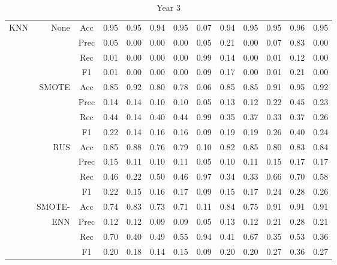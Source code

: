 \begin{table*}
\begin{narrow}{-1cm}{-1cm}
\begin{subtable}[t]{2.05\columnwidth}
\begin{tabular}{l|r|c|cccccccccc}
        KNN & None & Acc & 0.95 & 0.95 & 0.94 & 0.95 & 0.07 & 0.94 & 0.95 & 0.95 & 0.96 & 0.95 \\
        ~ & ~ & Prec & 0.05 & 0.00 & 0.00 & 0.00 & 0.05 & 0.21 & 0.00 & 0.07 & 0.83 & 0.00 \\
        ~ & ~ & Rec & 0.01 & 0.00 & 0.00 & 0.00 & 0.99 & 0.14 & 0.00 & 0.01 & 0.12 & 0.00 \\
        ~ & ~ & F1 & 0.01 & 0.00 & 0.00 & 0.00 & 0.09 & 0.17 & 0.00 & 0.01 & 0.21 & 0.00 \\
        \cline{2-13}
        ~ & SMOTE & Acc & 0.85 & 0.92 & 0.80 & 0.78 & 0.06 & 0.85 & 0.85 & 0.91 & 0.95 & 0.92 \\
        ~ & ~ & Prec & 0.14 & 0.14 & 0.10 & 0.10 & 0.05 & 0.13 & 0.12 & 0.22 & 0.45 & 0.23 \\
        ~ & ~ & Rec & 0.44 & 0.14 & 0.40 & 0.44 & 0.99 & 0.35 & 0.37 & 0.33 & 0.37 & 0.26 \\
        ~ & ~ & F1 & 0.22 & 0.14 & 0.16 & 0.16 & 0.09 & 0.19 & 0.19 & 0.26 & 0.40 & 0.24 \\
        \cline{2-13}
        ~ & RUS & Acc & 0.85 & 0.88 & 0.76 & 0.79 & 0.10 & 0.82 & 0.85 & 0.80 & 0.83 & 0.84 \\
        ~ & ~ & Prec & 0.15 & 0.11 & 0.10 & 0.11 & 0.05 & 0.10 & 0.11 & 0.15 & 0.17 & 0.17 \\
        ~ & ~ & Rec & 0.46 & 0.22 & 0.50 & 0.46 & 0.97 & 0.34 & 0.33 & 0.66 & 0.70 & 0.58 \\
        ~ & ~ & F1 & 0.22 & 0.15 & 0.16 & 0.17 & 0.09 & 0.15 & 0.17 & 0.24 & 0.28 & 0.26 \\
        \cline{2-13}
        ~ & SMOTE- & Acc & 0.74 & 0.83 & 0.73 & 0.71 & 0.11 & 0.84 & 0.75 & 0.91 & 0.91 & 0.91 \\
        ~ & ENN & Prec & 0.12 & 0.12 & 0.09 & 0.09 & 0.05 & 0.13 & 0.12 & 0.21 & 0.28 & 0.21 \\
        ~ & ~ & Rec & 0.70 & 0.40 & 0.49 & 0.55 & 0.94 & 0.41 & 0.67 & 0.35 & 0.53 & 0.36 \\
        ~ & ~ & F1 & 0.20 & 0.18 & 0.14 & 0.15 & 0.09 & 0.20 & 0.20 & 0.27 & 0.36 & 0.27 \\

       \hline \hline
         
         
    \end{tabular}
    \caption{\label{tab::results_y3} Year 3}
    
   
\end{subtable}

\end{narrow}
\end{table*} 





